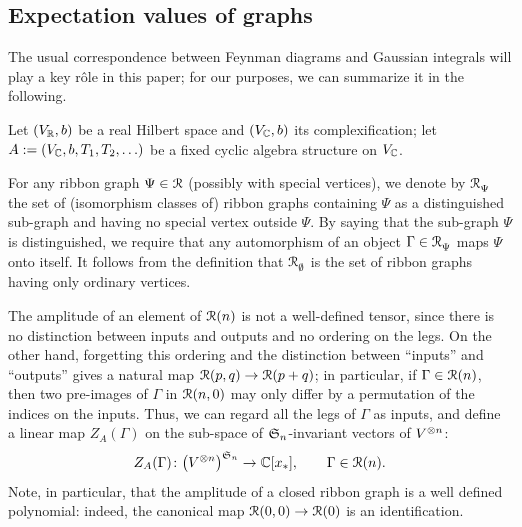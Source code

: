 \documentclass[11pt,twoside]{article}
\theoremstyle{plain}
\theoremstyle{remark}
\theoremstyle{definition}
\numberwithin{equation}{section} %
\begin{document}
\subsection{Expectation values of graphs}
\label{sec:expectation}

The usual correspondence between Feynman diagrams and Gaussian
integrals will play a key r{\^o}le in this paper; for our purposes,
we can summarize it in the following.


Let $(V_{\mathbb{R}},b)$ be a real Hilbert space and $(V_{\mathbb{C}},b)$ its
complexification; let $A := (V_\setC, b, T_1, T_2, \ldots)$ be a fixed cyclic
algebra structure on $V_{\mathbb{C}}$.

For any ribbon graph \(\Psi\in\mathcal{R}\) (possibly with special vertices), we
denote by \(\mathcal{R}_{\Psi}^{}\) the set of (isomorphism classes of) ribbon
graphs containing \(\Psi\) as a distinguished sub-graph and having no
special vertex outside \(\Psi\). By saying that the sub-graph \(\Psi\) is
distinguished, we require that any automorphism of an object \(\Gamma \in
\mathcal{R}_{\Psi}^{}\) maps \(\Psi\) onto itself.  It follows from the definition
that \(\mathcal{R}_\emptyset^{}\) is the set of ribbon graphs having only ordinary
vertices.

The amplitude of an element of $\mathcal{R}(n)$ is not a well-defined tensor,
since there is no distinction between inputs and outputs and no
ordering on the legs. On the other hand, forgetting this ordering and
the distinction between ``inputs'' and ``outputs'' gives a natural map
$\mathcal{R}(p,q)\to\mathcal{R}(p+q)$; in particular, if $\Gamma\in\mathcal{R}(n)$, then two pre-images of
$\Gamma$ in $\mathcal{R}(n,0)$ may only differ by a permutation of the indices on
the inputs. Thus, we can regard all the legs of $\Gamma$ as inputs, and
define a linear map $Z_A(\Gamma)$ on the sub-space of $\mathfrak{S}_{n}$-invariant
vectors of $V\sp{\otimes n}$:
\begin{equation*}
  Z_{A}(\Gamma)\colon \bigl(V\tp{n}\bigr)^{\Perm{n}}\to \setC[x_*],
  \qquad
  \Gamma\in\R(n).
\end{equation*}
Note, in particular, that the amplitude of a closed ribbon graph is a well
defined polynomial: indeed, the canonical map $\mathcal{R}(0,0)\to\mathcal{R}(0)$ is an
identification.
\end{document}
